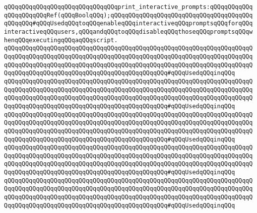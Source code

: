 \newline
\verb|qQQqqQQqqQQqqQQqqQQqqQQqqQQqqQQqprint_interactive_prompts:qQQqqQQqqQQqqQQqqQQqqQQqRef(qQQqBoolqQQq);qQQqqQQqqQQqqQQqqQQqqQQqqQQqqQQqqQQqqQQqqQQqqQQq#qQQqUsedqQQqtoqQQqenableqQQqinteractiveqQQqpromptsqQQqforqQQqinteractiveqQQqusers,qQQqandqQQqtoqQQqdisableqQQqthoseqQQqpromptsqQQqwhenqQQqexecutingqQQqaqQQqscript.|\newline
\verb|qQQqqQQqqQQqqQQqqQQqqQQqqQQqqQQqqQQqqQQqqQQqqQQqqQQqqQQqqQQqqQQqqQQqqQQqqQQqqQQqqQQqqQQqqQQqqQQqqQQqqQQqqQQqqQQqqQQqqQQqqQQqqQQqqQQqqQQqqQQqqQQqqQQqqQQqqQQqqQQqqQQqqQQqqQQqqQQqqQQqqQQqqQQqqQQqqQQqqQQqqQQqqQQqqQQqqQQqqQQqqQQqqQQqqQQqqQQqqQQqqQQqqQQqqQQqqQQq#qQQqUsedqQQqinqQQq|\newline
\verb|qQQqqQQqqQQqqQQqqQQqqQQqqQQqqQQqqQQqqQQqqQQqqQQqqQQqqQQqqQQqqQQqqQQqqQQqqQQqqQQqqQQqqQQqqQQqqQQqqQQqqQQqqQQqqQQqqQQqqQQqqQQqqQQqqQQqqQQqqQQqqQQqqQQqqQQqqQQqqQQqqQQqqQQqqQQqqQQqqQQqqQQqqQQqqQQqqQQqqQQqqQQqqQQqqQQqqQQqqQQqqQQqqQQqqQQqqQQqqQQqqQQqqQQqqQQqqQQq#qQQqUsedqQQqinqQQq|\newline
\verb|qQQqqQQqqQQqqQQqqQQqqQQqqQQqqQQqqQQqqQQqqQQqqQQqqQQqqQQqqQQqqQQqqQQqqQQqqQQqqQQqqQQqqQQqqQQqqQQqqQQqqQQqqQQqqQQqqQQqqQQqqQQqqQQqqQQqqQQqqQQqqQQqqQQqqQQqqQQqqQQqqQQqqQQqqQQqqQQqqQQqqQQqqQQqqQQqqQQqqQQqqQQqqQQqqQQqqQQqqQQqqQQqqQQqqQQqqQQqqQQqqQQqqQQqqQQqqQQq#qQQqUsedqQQqinqQQq|\newline
\verb|qQQqqQQqqQQqqQQqqQQqqQQqqQQqqQQqqQQqqQQqqQQqqQQqqQQqqQQqqQQqqQQqqQQqqQQqqQQqqQQqqQQqqQQqqQQqqQQqqQQqqQQqqQQqqQQqqQQqqQQqqQQqqQQqqQQqqQQqqQQqqQQqqQQqqQQqqQQqqQQqqQQqqQQqqQQqqQQqqQQqqQQqqQQqqQQqqQQqqQQqqQQqqQQqqQQqqQQqqQQqqQQqqQQqqQQqqQQqqQQqqQQqqQQqqQQqqQQq#qQQqUsedqQQqinqQQq|\newline
\verb|qQQqqQQqqQQqqQQqqQQqqQQqqQQqqQQqqQQqqQQqqQQqqQQqqQQqqQQqqQQqqQQqqQQqqQQqqQQqqQQqqQQqqQQqqQQqqQQqqQQqqQQqqQQqqQQqqQQqqQQqqQQqqQQqqQQqqQQqqQQqqQQqqQQqqQQqqQQqqQQqqQQqqQQqqQQqqQQqqQQqqQQqqQQqqQQqqQQqqQQqqQQqqQQqqQQqqQQqqQQqqQQqqQQqqQQqqQQqqQQqqQQqqQQqqQQqqQQq#qQQqUsedqQQqinqQQq|\newline
